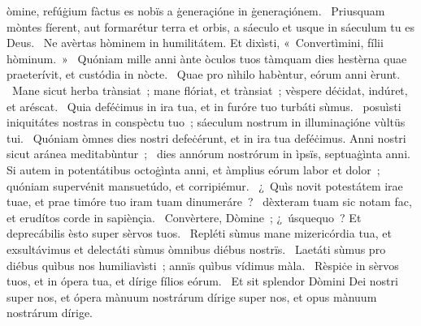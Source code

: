 \psalmChapterWithInscription{}
{ }
{%
òmine, refúġium fàctus es nobïs a ġeneraçióne in ġeneraçiónem. 
~Priusquam mòntes fíerent, aut formarétur terra et orbis, a sáeculo et usque in sáeculum tu es Deus. 
~Ne avèrtas hòminem in humilitátem. Et dixìsti, «~Convertìmini, fílii hòminum.~»
~Quóniam mille anni ànte òculos tuos tàmquam dies hestèrna quae praeterívit, et custódia in nòcte. 
~Quae pro nìhilo habèntur, eórum anni èrunt. 
~Mane sicut herba trànsiat~; mane flóriat, et trànsiat~; vèspere déċidat, indúret, et aréscat. 
~Quia deféċimus in ira tua, et in furóre tuo turbáti sùmus. 
~posuìsti iniquitátes nostras in conspèctu tuo~; sáeculum nostrum in illuminaçióne vùltüs tui. 
~Quóniam òmnes dies nostri defeċérunt, et in ira tua deféċimus. Anni nostri sicut aránea meditabùntur~; 
~dies annórum nostrórum in ìpsïs, septuaġìnta anni. Si autem in potentátibus octoġìnta anni, et àmplius eórum labor et dolor~; quóniam supervénit mansuetúdo, et corripiémur. 
~¿~Quìs novit potestátem irae tuae, et prae timóre tuo iram tuam dinumeráre~? 
~dèxteram tuam sic notam fac, et erudítos corde in sapiènçia. 
~Convèrtere, Dòmine~; ¿~úsquequo~? Et deprecábilis èsto super sèrvos tuos. 
~Repléti sùmus mane mizericórdia tua, et exsultávimus et delectáti sùmus òmnibus diébus nostrïs. 
~Laetáti sùmus pro diébus quìbus nos humiliavìsti~; annïs quìbus vídimus màla. 
~Rèspiċe in sèrvos tuos, et in ópera tua, et dírige fílios eórum. 
~Et sit splendor Dòmini Dei nostri super nos, et ópera mànuum nostrárum dírige super nos, et opus mànuum nostrárum dírige. 
}
